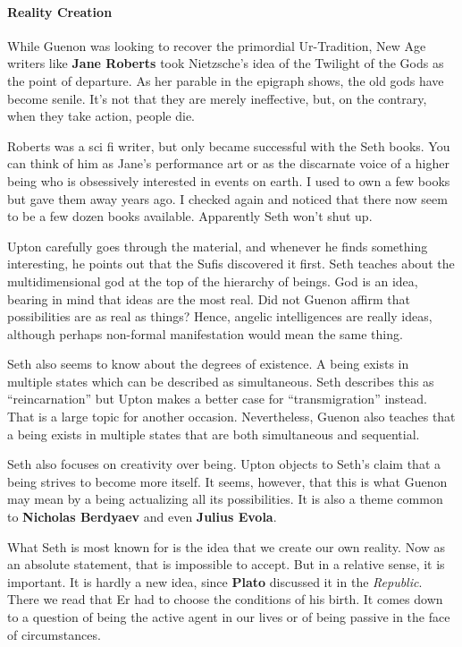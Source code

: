 \paragraph{Reality Creation}
While Guenon was looking to recover the primordial Ur-Tradition, New Age writers like \textbf{Jane Roberts} took Nietzsche's idea of the Twilight of the Gods as the point of departure. As her parable in the epigraph shows, the old gods have become senile. It's not that they are merely ineffective, but, on the contrary, when they take action, people die.

Roberts was a sci fi writer, but only became successful with the Seth books. You can think of him as Jane's performance art or as the discarnate voice of a higher being who is obsessively interested in events on earth. I used to own a few books but gave them away years ago. I checked again and noticed that there now seem to be a few dozen books available. Apparently Seth won't shut up.

Upton carefully goes through the material, and whenever he finds something interesting, he points out that the Sufis discovered it first. Seth teaches about the multidimensional god at the top of the hierarchy of beings. God is an idea, bearing in mind that ideas are the most real. Did not Guenon affirm that possibilities are as real as things? Hence, angelic intelligences are really ideas, although perhaps non-formal manifestation would mean the same thing.

Seth also seems to know about the degrees of existence. A being exists in multiple states which can be described as simultaneous. Seth describes this as “reincarnation” but Upton makes a better case for “transmigration” instead. That is a large topic for another occasion. Nevertheless, Guenon also teaches that a being exists in multiple states that are both simultaneous and sequential.

Seth also focuses on creativity over being. Upton objects to Seth's claim that a being strives to become more itself. It seems, however, that this is what Guenon may mean by a being actualizing all its possibilities. It is also a theme common to \textbf{Nicholas Berdyaev} and even \textbf{Julius Evola}.

What Seth is most known for is the idea that we create our own reality. Now as an absolute statement, that is impossible to accept. But in a relative sense, it is important. It is hardly a new idea, since \textbf{Plato} discussed it in the \emph{Republic}. There we read that Er had to choose the conditions of his birth. It comes down to a question of being the active agent in our lives or of being passive in the face of circumstances.

